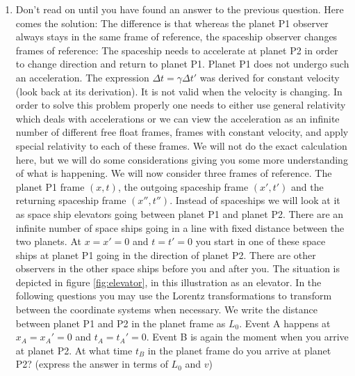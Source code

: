 {\begin{multicols}{2}
\begin{enumerate}
\item Don't read on until you have found an answer to the previous question. Here comes the solution: The difference is that whereas the planet P1 observer always stays in the same frame of reference, the spaceship observer changes frames of reference: The spaceship needs to accelerate at planet P2 in order to change direction and return to planet P1. Planet P1 does not undergo such an acceleration. The expression $\Delta t=\gamma \Delta t'$ was derived for constant velocity (look back at its derivation). It is not valid when the velocity is changing. In order to solve this problem properly one needs to either use general relativity which deals with accelerations or we can view the acceleration as an infinite number of different free float frames, frames with constant velocity, and apply special relativity to each of these frames. We will not do the exact calculation here, but we will do some considerations giving you some more understanding of what is happening. We will now consider three frames of reference. The planet P1 frame $(x,t)$, the outgoing spaceship frame $(x',t')$ and the returning spaceship frame $(x'',t'')$. Instead of spaceships we will look at it as space ship elevators going between planet P1 and planet P2. There are an infinite number of space ships going in a line with fixed distance between the two planets. At $x=x'=0$ and $t=t'=0$ you start in one of these space ships at planet P1 going in the direction of planet P2. There are other observers in the other space ships before you and after you. The situation is depicted in figure \ref{fig:elevator}, in this illustration as an elevator. In the following questions you may use the Lorentz transformations to transform between the coordinate systems when necessary. We write the distance between planet P1 and P2 in the planet frame as $L_0$. Event A happens at $x_A=x_A'=0$ and $t_A=t_A'=0$. Event B is again the moment when you arrive at planet P2. At what time $t_B$ in the planet frame do you arrive at planet P2? (express the answer in terms of $L_0$ and $v$)
\begin{Figure}%
\centering

\end{Figure}
\end{enumerate}
\end{multicols}}
